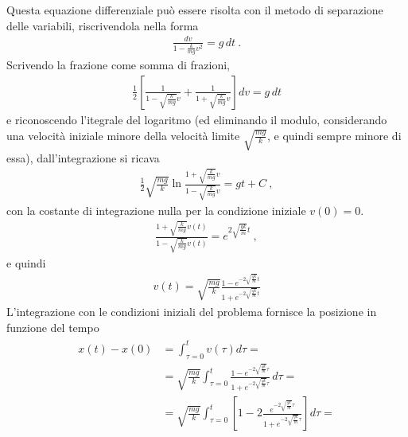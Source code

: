 \documentclass[letterpaper,10pt,italian]{jupyterBook}
\begin{document}
\sphinxAtStartPar
Questa equazione differenziale può essere risolta con il metodo di separazione delle variabili, riscrivendola nella forma
\begin{equation*}
\begin{split}\frac{d v}{1 - \frac{k}{m g} v^2} = g \, dt \ .\end{split}
\end{equation*}
\sphinxAtStartPar
Scrivendo la frazione come somma di frazioni,
\begin{equation*}
\begin{split} \frac{1}{2}\left[ \frac{1}{1 - \sqrt{\frac{k}{m g}} v} + \frac{1}{1 + \sqrt{\frac{k}{m g}} v} \right] dv = g \, dt \end{split}
\end{equation*}
\sphinxAtStartPar
e riconoscendo l’itegrale del logaritmo (ed eliminando il modulo, considerando una velocità iniziale minore della velocità limite \(\sqrt{\frac{mg}{k}}\), e quindi sempre minore di essa), dall’integrazione si ricava
\begin{equation*}
\begin{split}\frac{1}{2} \sqrt{\frac{mg}{k}} \ln \frac{1 + \sqrt{\frac{k}{mg}} v}{1 - \sqrt{\frac{k}{mg}} v} = g t + C \ ,\end{split}
\end{equation*}
\sphinxAtStartPar
con la costante di integrazione nulla per la condizione iniziale \(v(0) = 0\).
\begin{equation*}
\begin{split}\frac{1 + \sqrt{\frac{k}{mg}} v(t)}{1 - \sqrt{\frac{k}{mg}} v(t)} = e^{2 \sqrt{\frac{gk}{m}} t} \ ,\end{split}
\end{equation*}
\sphinxAtStartPar
e quindi
\begin{equation*}
\begin{split}v(t) = \sqrt{\frac{mg}{k}} \frac{1 - e^{-2 \sqrt{\frac{gk}{m}} t}}{1 + e^{-2 \sqrt{\frac{gk}{m}} t}}\end{split}
\end{equation*}
\sphinxAtStartPar
L’integrazione con le condizioni iniziali del problema fornisce la posizione in funzione del tempo
\begin{equation*}
\begin{split}\begin{aligned}
  x(t) - x(0) 
  & = \int_{\tau=0}^t v(\tau) d \tau = \\
  & = \sqrt{\frac{mg}{k}} \int_{\tau=0}^t \frac{1 - e^{-2 \sqrt{\frac{gk}{m}} \tau}}{1 + e^{-2 \sqrt{\frac{gk}{m}} \tau}} \, d \tau = \\
  & = \sqrt{\frac{mg}{k}} \int_{\tau=0}^t \left[ 1 - 2 \frac{e^{-2 \sqrt{\frac{gk}{m}} \tau}}{1 + e^{-2 \sqrt{\frac{gk}{m}} \tau}} \right] d \tau = \\
\end{aligned}\end{split}
\end{equation*}
\end{document}
